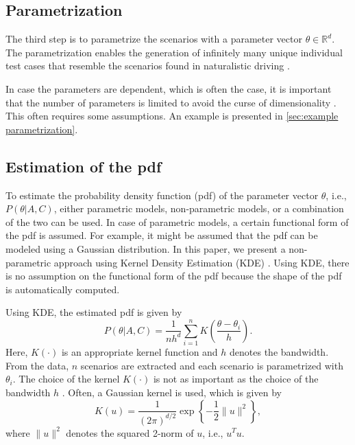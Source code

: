 \subsection{Parametrization}
\label{sec:parametrization}

The third step is to parametrize the scenarios with a parameter vector $\theta \in \mathbb{R}^d$. The parametrization enables the generation of infinitely many unique individual test cases that resemble the scenarios found in naturalistic driving \cite{deGelder2017assessment,elrofai2018scenario}.

In case the parameters are dependent, which is often the case, it is important that the number of parameters is limited to avoid the curse of dimensionality \cite{scott2015multivariate}. This often requires some assumptions. An example is presented in \cref{sec:example parametrization}.



\subsection{Estimation of the pdf}
\label{sec:pdf}

To estimate the probability density function (pdf) of the parameter vector $\theta$, i.e., $P(\theta|A,C)$, either parametric models, non-parametric models, or a combination of the two can be used. In case of parametric models, a certain functional form of the pdf is assumed. For example, it might be assumed that the pdf can be modeled using a Gaussian distribution. In this paper, we present a non-parametric approach using Kernel Density Estimation (KDE) \cite{rosenblatt1956remarks, parzen1962estimation}. Using KDE, there is no assumption on the functional form of the pdf because the shape of the pdf is automatically computed.

Using KDE, the estimated pdf is given by
\begin{equation}
	\label{eq:kde}
	P(\theta|A,C) = \frac{1}{nh^d} \sum_{i=1}^n K\left(\frac{\theta - \theta_i}{h}\right).
\end{equation}
Here, $K(\cdot)$ is an appropriate kernel function and $h$ denotes the bandwidth. From the data, $n$ scenarios are extracted and each scenario is parametrized with $\theta_i$. The choice of the kernel $K(\cdot)$ is not as important as the choice of the bandwidth $h$ \cite{turlach1993bandwidthselection}. Often, a Gaussian kernel is used, which is given by
\begin{equation}
	\label{eq:gaussian kernel}
	K(u) = \frac{1}{\left( 2\pi \right)^{d/2}} \exp \left\{ -\frac{1}{2} \|u\|^2 \right\},
\end{equation}
where $\|u\|^2$ denotes the squared 2-norm of $u$, i.e., $u^T u$.

